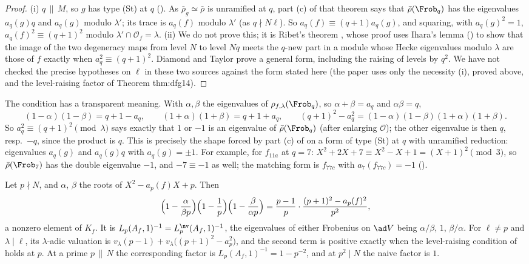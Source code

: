 \begin{proof}
(i) $q\,\|\,M$, so $g$ has type (St) at $q$ (). As $\bar\rho_g\simeq\bar\rho$ is unramified at $q$, part (c) of that theorem says that
$\bar\rho(\Frob_q)$ has the eigenvalues $a_q(g)q$ and $a_q(g)$ modulo $\lambda'$; its trace is $a_q(f)$ modulo $\lambda'$ (as $q\nmid N\ell$). So $a_q(f)\equiv(q+1)a_q(g)$, and squaring, with
$a_q(g)^2=1$, $a_q(f)^2\equiv(q+1)^2$ modulo $\lambda'\cap\mathcal{O}_f=\lambda$. (ii) We do not prove this; it is Ribet's theorem \cite{Ribet84}, whose proof uses Ihara's lemma
() to show that the image of the two degeneracy maps from level $N$ to level $Nq$ meets the $q$-new part in a module whose
Hecke eigenvalues modulo $\lambda$ are those of $f$ exactly when $a_q^2\equiv(q+1)^2$. Diamond and Taylor \cite{DiamondTaylor94} prove a general form, including the
raising of levels by $q^2$. We have not checked the precise hypotheses on $\ell$ in these two sources against the form stated here (the paper uses
only the necessity (i), proved above, and the level-raising factor of Theorem thm:dfg14).
\end{proof}

The condition has a transparent meaning. With $\alpha,\beta$ the eigenvalues of $\rho_{f,\lambda}(\Frob_q)$, so $\alpha+\beta=a_q$ and $\alpha\beta=q$,
\[
(1-\alpha)(1-\beta)=q+1-a_q,\qquad(1+\alpha)(1+\beta)=q+1+a_q,\qquad (q+1)^2-a_q^2=(1-\alpha)(1-\beta)(1+\alpha)(1+\beta).
\]
So $a_q^2\equiv(q+1)^2\pmod\lambda$ says exactly that $1$ or $-1$ is an eigenvalue of $\bar\rho(\Frob_q)$ (after enlarging $\mathcal{O}$); the other eigenvalue is then $q$, resp.\ $-q$, since the
product is $q$. This is precisely the shape forced by part (c) of  on a form of type (St) at $q$ with unramified reduction: eigenvalues
$a_q(g)$ and $a_q(g)q$ with $a_q(g)=\pm1$. For example, for $f_{11a}$ at $q=7$: $X^2+2X+7\equiv X^2-X+1=(X+1)^2\pmod3$, so $\bar\rho(\Frob_7)$ has the double eigenvalue $-1$, and $-7\equiv-1$
as well; the matching form is $f_{77c}$ with $a_7(f_{77c})=-1$ ().

\begin{proposition}\label{prop:modgalrep:level-raising-factor}
Let $p\nmid N$, and $\alpha$, $\beta$ the roots of $X^2-a_p(f)X+p$. Then
\[
\Bigl(1-\frac{\alpha}{\beta p}\Bigr)\Bigl(1-\frac1p\Bigr)\Bigl(1-\frac{\beta}{\alpha p}\Bigr)=\frac{p-1}{p}\cdot\frac{(p+1)^2-a_p(f)^2}{p^2},
\]
a nonzero element of $K_f$. It is $L_p(A_f,1)^{-1}=L_p^{\nv}(A_f,1)^{-1}$, the eigenvalues of either Frobenius on $\ad V$ being $\alpha/\beta$, $1$, $\beta/\alpha$. For $\ell\ne p$ and
$\lambda\mid\ell$, its $\lambda$-adic valuation is $v_\lambda(p-1)+v_\lambda\bigl((p+1)^2-a_p^2\bigr)$, and the second term is positive exactly when the level-raising condition of
 holds at $p$. At a prime $p\,\|\,N$ the corresponding factor is $L_p(A_f,1)^{-1}=1-p^{-2}$, and at $p^2\mid N$ the naive factor is $1$.
\end{proposition}


